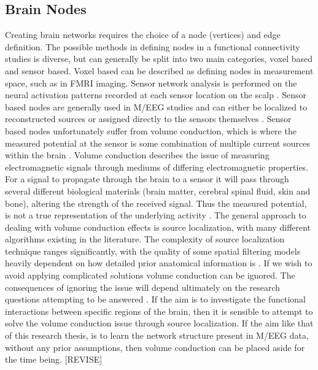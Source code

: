 \documentclass[11pt]{article}
\begin{document}
\subsection{Brain Nodes}
Creating brain networks requires the choice of a node (vertices) and edge definition. The possible methods in defining nodes in a functional connectivity studies is diverse, but can generally be split into two main categories, voxel based and sensor based. Voxel based can be described as defining nodes in measurement space, such as in FMRI imaging. Sensor network analysis is performed on the neural activation patterns recorded at each sensor location on the scalp \citep{fornito2013graph}. Sensor based nodes are generally used in M/EEG studies and can either be localized to reconstructed sources or assigned directly to the sensors themselves \citep{fall}. Sensor based nodes unfortunately suffer from volume conduction, which is where the measured potential at the sensor is some combination of multiple current sources within the brain \citep{eeg97}. Volume conduction describes the issue of measuring electromagnetic signals through mediums of differing electromagnetic properties. For a signal to propagate through the brain to a sensor it will pass through several different biological materials (brain matter, cerebral spinal fluid, skin and bone), altering the strength of the received signal. Thus the measured potential, is not a true representation of the underlying activity \citep{sens2}. The general approach to dealing with volume conduction effects is source localization, with many different algorithms existing in the literature. The complexity of source localization technique ranges significantly, with the quality of some spatial filtering models heavily dependent on how detailed prior anatomical information is \citep{gross}. If we wish to avoid applying complicated solutions volume conduction can be ignored. The consequences of ignoring the issue will depend ultimately on the research questions attempting to be answered \citep{fall}. If the aim is to investigate the functional interactions between specific regions of the brain, then it is sensible to attempt to solve the volume conduction issue through source localization. If the aim like that of this research thesis, is to learn the network structure present in M/EEG data, without any prior assumptions, then volume conduction can be placed aside for the time being. [REVISE]
 
\end{document}
